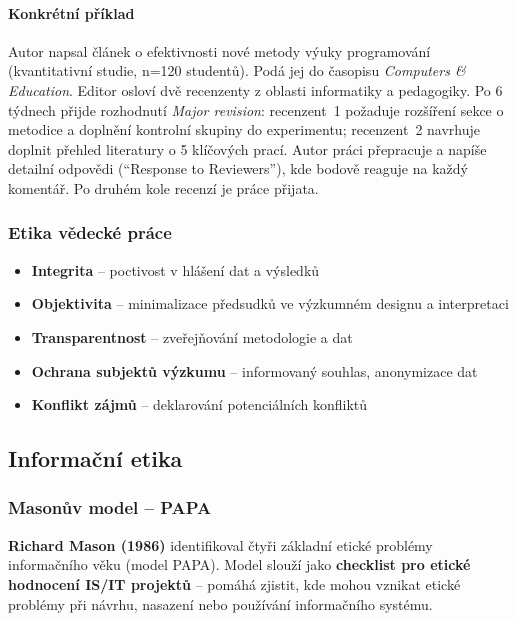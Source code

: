 \paragraph{Konkrétní příklad}
Autor napsal článek o efektivnosti nové metody výuky programování (kvantitativní studie, n=120 studentů). Podá jej do časopisu \textit{Computers \& Education}. Editor osloví dvě recenzenty z oblasti informatiky a pedagogiky. Po 6 týdnech přijde rozhodnutí \textit{Major revision}: recenzent~1 požaduje rozšíření sekce o metodice a doplnění kontrolní skupiny do experimentu; recenzent~2 navrhuje doplnit přehled literatury o 5 klíčových prací. Autor práci přepracuje a napíše detailní odpovědi (``Response to Reviewers''), kde bodově reaguje na každý komentář. Po druhém kole recenzí je práce přijata.

\subsubsection{Etika vědecké práce}

\begin{itemize}
  \item \textbf{Integrita} -- poctivost v hlášení dat a výsledků
  \item \textbf{Objektivita} -- minimalizace předsudků ve výzkumném designu a interpretaci
  \item \textbf{Transparentnost} -- zveřejňování metodologie a dat
  \item \textbf{Ochrana subjektů výzkumu} -- informovaný souhlas, anonymizace dat
  \item \textbf{Konflikt zájmů} -- deklarování potenciálních konfliktů
\end{itemize}

\subsection{Informační etika}

\subsubsection{Masonův model -- PAPA}

\textbf{Richard Mason (1986)} identifikoval čtyři základní etické problémy informačního věku (model PAPA). Model slouží jako \textbf{checklist pro etické hodnocení IS/IT projektů} -- pomáhá zjistit, kde mohou vznikat etické problémy při návrhu, nasazení nebo používání informačního systému.

